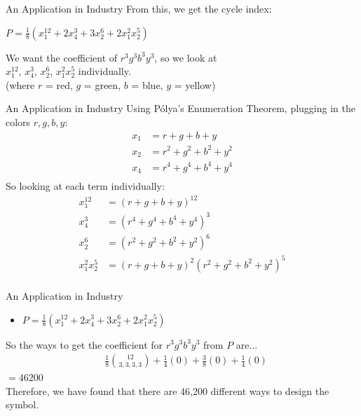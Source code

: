 \documentclass{beamer}
\begin{document}
\begin{frame}{An Application in Industry}
From this, we get the cycle index:\\
\begin{center}
$P = \frac{1}{8}(x_1^{12}+2x_4^3 +3x_2^6 +2x_1^2 x_2^5)$
\end{center}
We want the coefficient of $r^3g^3b^3y^3$, so we look at\\
$x_1^{12}$, $x_4^{3}$, $x_2^{6}$, $x_1^{2} x_2^5$ individually.\\
(where $r$ = red, $g$ = green, $b$ = blue, $y$ = yellow)
\end{frame}

\begin{frame}{An Application in Industry}
Using Pólya's Enumeration Theorem, plugging in the colors $r,g,b,y$:\\
\begin{align*}
x_1 &= r+g+b+y\\
x_2 &=r^2+g^2+b^2+y^2\\
x_4 &=r^4+g^4+b^4+y^4\\
\end{align*}
So looking at each term individually:
\begin{align*}
x_1^{12} &= (r+g+b+y)^{12}\\
x_4^3 &=(r^4+g^4+b^4+y^4)^3\\
x_2^6 &=(r^2+g^2+b^2+y^2)^6\\
x_1^{2}x_2^5 &= (r+g+b+y)^2(r^2+g^2+b^2+y^2)^5\\
\end{align*}
\end{frame}

\begin{frame}{An Application in Industry}
\begin{itemize}
\item $P = \frac{1}{8}(x_1^{12}+2x_4^3 +3x_2^6 +2x_1^2 x_2^5)$
\end{itemize}
So the ways to get the coefficient for $r^3g^3b^3y^3$ from $P$ are...\\
\begin{align*}
&\frac{1}{8}{{12}\choose{3,3,3,3}}+\frac{1}{4}(0) + \frac{3}{8}(0) + \frac{1}{4}(0)
\end{align*}
$=46200$\\
\vspace{40pt}
Therefore, we have found that there are 46,200 different ways to design the symbol.
\end{frame}
\end{document}
